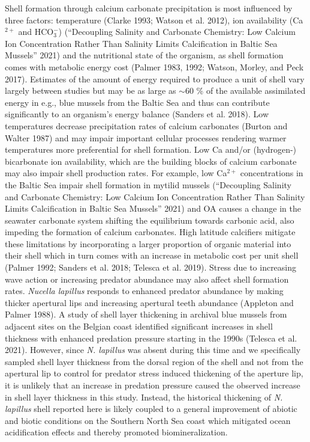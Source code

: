 \documentclass[smallextended]{svjour3}       %
\begin{document}
Shell formation through calcium carbonate precipitation is most
influenced by three factors: temperature (Clarke 1993; Watson et al.
2012), ion availability (Ca\(^{2+}\) and HCO\(_3^-\)) ({``Decoupling
Salinity and Carbonate Chemistry: Low Calcium Ion Concentration Rather
Than Salinity Limits Calcification in Baltic Sea Mussels''} 2021) and
the nutritional state of the organism, as shell formation comes with
metabolic energy cost (Palmer 1983, 1992; Watson, Morley, and Peck
2017). Estimates of the amount of energy required to produce a unit of
shell vary largely between studies but may be as large as \(\sim60\) \%
of the available assimilated energy in e.g., blue mussels from the
Baltic Sea and thus can contribute significantly to an organism's energy
balance (Sanders et al. 2018). Low temperatures decrease precipitation
rates of calcium carbonates (Burton and Walter 1987) and may impair
important cellular processes rendering warmer temperatures more
preferential for shell formation. Low Ca and/or (hydrogen-) bicarbonate
ion availability, which are the building blocks of calcium carbonate may
also impair shell production rates. For example, low Ca\(^{2+}\)
concentrations in the Baltic Sea impair shell formation in mytilid
mussels ({``Decoupling Salinity and Carbonate Chemistry: Low Calcium Ion
Concentration Rather Than Salinity Limits Calcification in Baltic Sea
Mussels''} 2021) and OA causes a change in the seawater carbonate system
shifting the equilibrium towards carbonic acid, also impeding the
formation of calcium carbonates. High latitude calcifiers mitigate these
limitations by incorporating a larger proportion of organic material
into their shell which in turn comes with an increase in metabolic cost
per unit shell (Palmer 1992; Sanders et al. 2018; Telesca et al. 2019).
Stress due to increasing wave action or increasing predator abundance
may also affect shell formation rates. \emph{Nucella lapillus} responds
to enhanced predator abundance by making thicker apertural lips and
increasing apertural teeth abundance (Appleton and Palmer 1988). A study
of shell layer thickening in archival blue mussels from adjacent sites
on the Belgian coast identified significant increases in shell thickness
with enhanced predation pressure starting in the 1990s (Telesca et al.
2021). However, since \emph{N. lapillus} was absent during this time and
we specifically sampled shell layer thickness from the dorsal region of
the shell and not from the apertural lip to control for predator stress
induced thickening of the aperture lip, it is unlikely that an increase
in predation pressure caused the observed increase in shell layer
thickness in this study. Instead, the historical thickening of \emph{N.
lapillus} shell reported here is likely coupled to a general improvement
of abiotic and biotic conditions on the Southern North Sea coast which
mitigated ocean acidification effects and thereby promoted
biomineralization.
\end{document}
